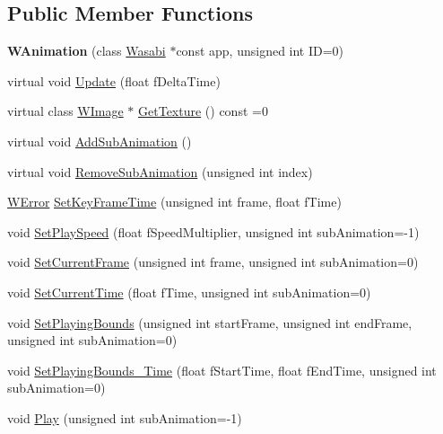 \subsection*{Public Member Functions}
\begin{DoxyCompactItemize}
\item 
{\bfseries W\+Animation} (class \hyperlink{class_wasabi}{Wasabi} $\ast$const app, unsigned int ID=0)\hypertarget{class_w_animation_ae96f0fbf2bb9d6d362d400056297a2a6}{}\label{class_w_animation_ae96f0fbf2bb9d6d362d400056297a2a6}

\item 
virtual void \hyperlink{class_w_animation_a14390c833c0f255fcb461661f0577c6e}{Update} (float f\+Delta\+Time)
\item 
virtual class \hyperlink{class_w_image}{W\+Image} $\ast$ \hyperlink{class_w_animation_a6d7a8cbd7db22b88c528c7ed2c61601f}{Get\+Texture} () const  =0
\item 
virtual void \hyperlink{class_w_animation_a42f0459e88ccf7e2c6414a9512865c6f}{Add\+Sub\+Animation} ()
\item 
virtual void \hyperlink{class_w_animation_ad5e5118abd61cbbc91b9b28ef0d6481b}{Remove\+Sub\+Animation} (unsigned int index)
\item 
\hyperlink{class_w_error}{W\+Error} \hyperlink{class_w_animation_a2dfe828c0ae005378bb267d55044cdbd}{Set\+Key\+Frame\+Time} (unsigned int frame, float f\+Time)
\item 
void \hyperlink{class_w_animation_ac9a3edc475eb5be9ee7ef56f717a30d4}{Set\+Play\+Speed} (float f\+Speed\+Multiplier, unsigned int sub\+Animation=-\/1)
\item 
void \hyperlink{class_w_animation_a4b4ef4c57105cad41308da11b2329bcc}{Set\+Current\+Frame} (unsigned int frame, unsigned int sub\+Animation=0)
\item 
void \hyperlink{class_w_animation_ab3784a49233c2683ff3ee6c40b92a307}{Set\+Current\+Time} (float f\+Time, unsigned int sub\+Animation=0)
\item 
void \hyperlink{class_w_animation_a74ee2ca45a4b268d944f4507354389bd}{Set\+Playing\+Bounds} (unsigned int start\+Frame, unsigned int end\+Frame, unsigned int sub\+Animation=0)
\item 
void \hyperlink{class_w_animation_a6b47183956a92e3da0526538d1b5105e}{Set\+Playing\+Bounds\+\_\+\+Time} (float f\+Start\+Time, float f\+End\+Time, unsigned int sub\+Animation=0)
\item 
void \hyperlink{class_w_animation_a9aea2f7128ee0235457852f06d0e4edc}{Play} (unsigned int sub\+Animation=-\/1)

\end{DoxyCompactItemize}
